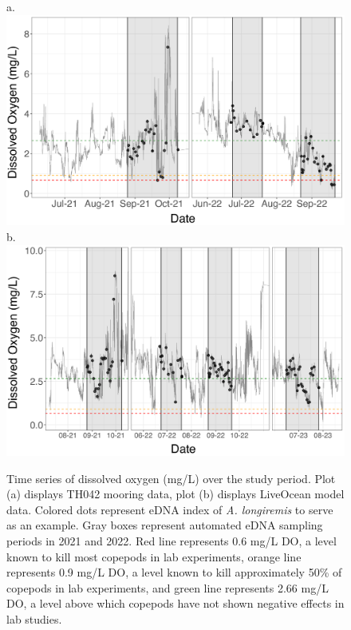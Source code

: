 \documentclass[12pt,twoside]{reedthesis}
\begin{document}
	\begin{figure}[!h]
		\begin{center}
			a. \includegraphics[scale=0.6]{Timeseries_example} \\
			b. \includegraphics[scale=0.6]{Timeseries_example_Mod}
			\caption[Time series]{Time series of dissolved oxygen (mg/L) over the study period. Plot (a) displays TH042 mooring data, plot (b) displays LiveOcean model data. Colored dots represent eDNA index of \textit{A. longiremis} to serve as an example. Gray boxes represent automated eDNA sampling periods in 2021 and 2022. Red line represents 0.6 mg/L DO, a level known to kill most copepods in lab experiments, orange line represents 0.9 mg/L DO, a level known to kill approximately 50\% of copepods in lab experiments, and green line represents 2.66 mg/L DO, a level above which copepods have not shown negative effects in lab studies.} %
		\end{center}
		\label{Timeseries}
	\end{figure} 
	
\end{document}
